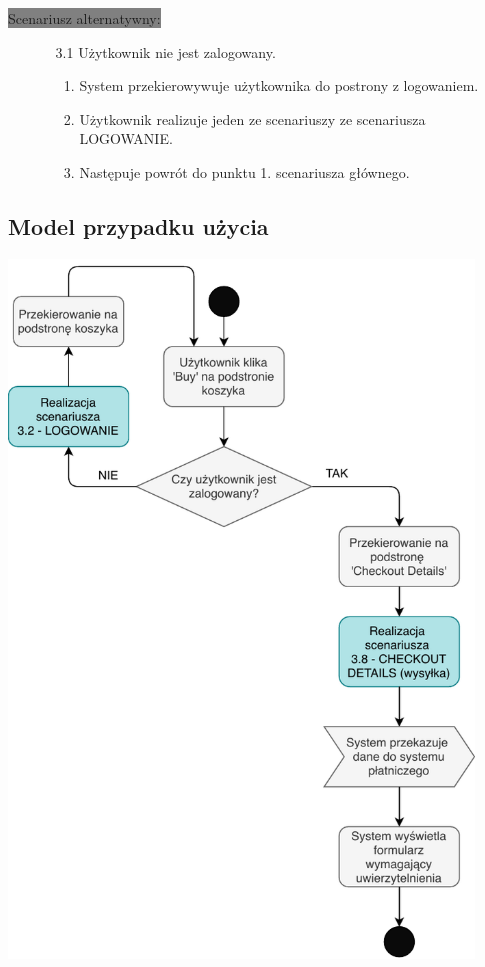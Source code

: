 \documentclass[12pt]{report}
\begin{document}
			\colorbox{grey}{Scenariusz alternatywny:}
			\begin{enumerate}\addtocounter{enumi}{6}
				\item[]
				\begin{enumerate}
					\item[3.1] Użytkownik nie jest zalogowany.
					\begin{enumerate}
						\item System przekierowywuje użytkownika do postrony z logowaniem.
						\item Użytkownik realizuje jeden ze scenariuszy ze scenariusza LOGOWANIE.
						\item Następuje powrót do punktu 1. scenariusza głównego.
					\end{enumerate}
				\end{enumerate}
			\end{enumerate}

		\subsection{Model przypadku użycia}
			\begin{center}
				\includegraphics[width=350pt]{zakup.pdf}
			\end{center}
\end{document}
